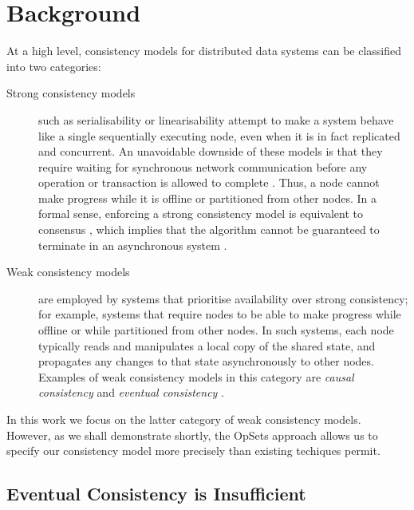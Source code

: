 \section{Background}\label{sec:background}

At a high level, consistency models for distributed data systems can be classified into two categories:
\begin{description}
\item[Strong consistency models] such as serialisability or linearisability \cite{Herlihy:1990jq} attempt to make a system behave like a single sequentially executing node, even when it is in fact replicated and concurrent.
An unavoidable downside of these models is that they require waiting for synchronous network communication before any operation or transaction is allowed to complete \cite{Davidson:1985hv,Gilbert:2002il}.
Thus, a node cannot make progress while it is offline or partitioned from other nodes.
In a formal sense, enforcing a strong consistency model is equivalent to consensus \cite{Chandra:1996cp,Herlihy:1991gk}, which implies that the algorithm cannot be guaranteed to terminate in an asynchronous system \cite{Fischer:1985tt}.

\item[Weak consistency models] are employed by systems that prioritise availability over strong consistency; for example, systems that require nodes to be able to make progress while offline or while partitioned from other nodes.
In such systems, each node typically reads and manipulates a local copy of the shared state, and propagates any changes to that state asynchronously to other nodes.
Examples of weak consistency models in this category are \emph{causal consistency} \cite{Attiya:2015dm,Mahajan:2011wz,Lloyd:2011hz} and \emph{eventual consistency} \cite{Bailis:2013jc,Burckhardt:2014hy,Terry:1994fp,Vogels:2009ca}.
\end{description}

In this work we focus on the latter category of weak consistency models.
However, as we shall demonstrate shortly, the OpSets approach allows us to specify our consistency model more precisely than existing techiques permit.

\subsection{Eventual Consistency is Insufficient}\label{sec:eventual-consistency}


